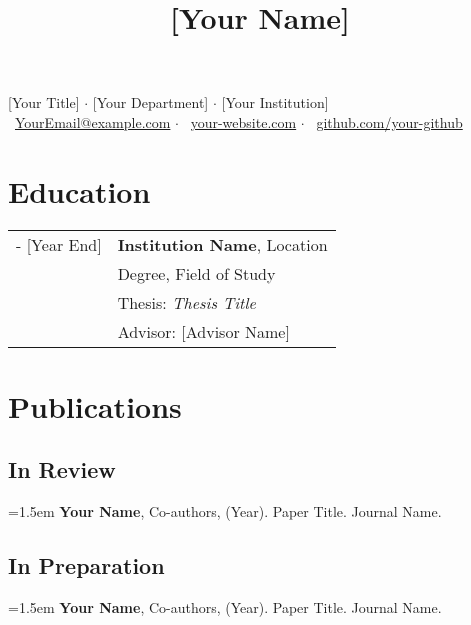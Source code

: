 \documentclass[a4paper,10pt]{article}
\begin{document}
\title{\LARGE\bfseries [Your Name]}
\author{}
\date{}

\maketitle \vspace{-2.0cm} %

\begin{center}
    [Your Title] $\cdot$ [Your Department] $\cdot$ [Your Institution] \\
    
    \faEnvelope\ \href{mailto:YourEmail@example.com}{YourEmail@example.com} $\cdot$ 
    \faGlobe\ \href{https://your-website.com}{your-website.com} $\cdot$ 
    \faGithub\ \href{https://github.com/your-github}{github.com/your-github} %
\end{center}

\thispagestyle{firstpagefooter}

\section{Education}
\begin{tabularx}{\textwidth}{>{\raggedright\arraybackslash}p{2.5cm} X}
[Year Start] - [Year End] & \textbf{Institution Name}, Location \\
               & Degree, Field of Study \\
               & Thesis: \textit{Thesis Title} \\
               & Advisor: [Advisor Name] \\
\end{tabularx}

\section{Publications}

\subsection{In Review} 
\hangindent=1.5em 
\textbf{Your Name}, Co-authors, (Year). Paper Title. Journal Name.

\subsection{In Preparation}
\hangindent=1.5em 
\textbf{Your Name}, Co-authors, (Year). Paper Title. Journal Name. 
\end{document}
